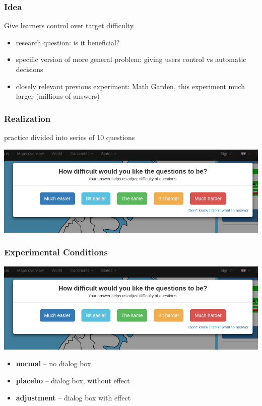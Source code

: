 \documentclass[bigger]{beamer}
\begin{document}
\begin{frame}
  \frametitle{Idea}

  \begin{block}{}
    Give learners control over target difficulty.
  \end{block}

  \begin{itemize}
  \item research question: is it beneficial?
  \item specific version of more general problem: giving users control vs
    automatic decisions
  \item closely relevant previous experiment: Math Garden, this experiment much
    larger (millions of answers)
  \end{itemize}
\end{frame}

\begin{frame}
  \frametitle{Realization}

  practice divided into series of 10 questions

  \bigskip

  \begin{center}
    \includegraphics[width=\linewidth]{modal}
  \end{center}
\end{frame}

\begin{frame}
  \frametitle{Experimental Conditions}

  \begin{center}
    \includegraphics[width=.65\linewidth]{modal}
  \end{center}

  \medskip

  \begin{itemize}
  \item \textbf{normal} -- no dialog box
  \item \textbf{placebo} -- dialog box, without effect
  \item \textbf{adjustment} -- dialog box with effect
  \end{itemize}
\end{frame}
\end{document}
